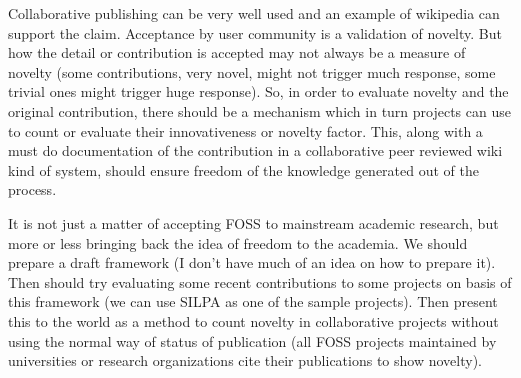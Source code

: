 {Collaborative publishing can be very well used and an example of wikipedia can support 
the claim. Acceptance by user community is a validation of novelty. But how the detail
or contribution is accepted may not always be a measure of novelty
(some contributions, very novel, might not trigger much response, some
trivial ones might trigger huge response). So, in order to evaluate novelty and the
original contribution, there should be a mechanism which in turn projects
can use to count or evaluate their innovativeness or novelty factor.
This, along with a must do documentation of the contribution in a collaborative
peer reviewed wiki kind of system, should ensure freedom of the knowledge
generated out of the process.

It is not just a matter of accepting FOSS to mainstream academic research, but 
more or less bringing back the idea of freedom to the academia. We should prepare 
a draft framework (I don't have much of an idea on how to prepare it). Then should try 
evaluating some recent contributions to some projects on basis of this framework (we can 
use SILPA as one of the sample projects). Then present this to the world as a method
to count novelty in collaborative projects without using the normal way of
status of publication (all FOSS projects maintained by universities or research
organizations cite their publications to show novelty).
}
\newpage
